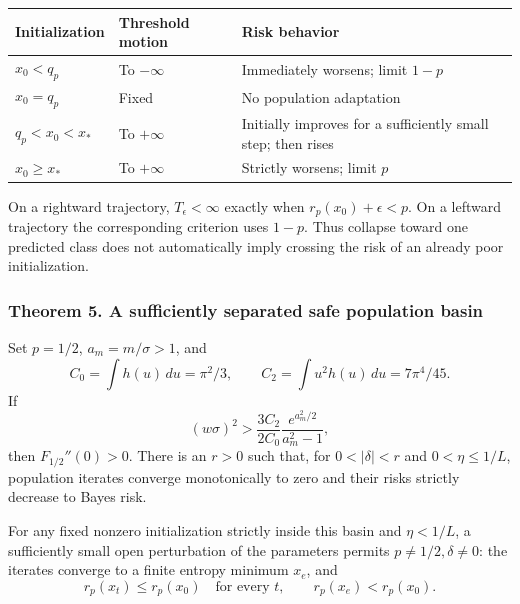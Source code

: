 {\def\LTcaptype{table} %
\begin{longtable}[]{@{}
  >{\raggedright\arraybackslash}p{}
  >{\raggedright\arraybackslash}p{}
  >{\raggedright\arraybackslash}p{}@{}}
\toprule\noalign{}
\begin{minipage}[b]{\linewidth}\raggedright
Initialization
\end{minipage} & \begin{minipage}[b]{\linewidth}\raggedright
Threshold motion
\end{minipage} & \begin{minipage}[b]{\linewidth}\raggedright
Risk behavior
\end{minipage} \\
\midrule\noalign{}
\endhead
\bottomrule\noalign{}
\endlastfoot
\(x_0<q_p\) & To \(-\infty\) & Immediately worsens; limit \(1-p\) \\
\(x_0=q_p\) & Fixed & No population adaptation \\
\(q_p<x_0<x_*\) & To \(+\infty\) & Initially improves for a sufficiently
small step; then rises \\
\(x_0\ge x_*\) & To \(+\infty\) & Strictly worsens; limit \(p\) \\
\end{longtable}
}

On a rightward trajectory, \(T_\epsilon<\infty\) exactly when
\(r_p(x_0)+\epsilon<p\). On a leftward trajectory the corresponding
criterion uses \(1-p\). Thus collapse toward one predicted class does
not automatically imply crossing the risk of an already poor
initialization.

\subsubsection{Theorem 5. A sufficiently separated safe population
basin}\label{draft-theorem-5.-a-sufficiently-separated-safe-population-basin}

Set \(p=1/2\), \(a_m=m/\sigma>1\), and \[
C_0=\int h(u)\,du=\pi^2/3,\qquad
C_2=\int u^2h(u)\,du=7\pi^4/45.
\] If \[
(w\sigma)^2>
\frac{3C_2}{2C_0}\frac{e^{a_m^2/2}}{a_m^2-1},
\] then \(F_{1/2}''(0)>0\). There is an \(r>0\) such that, for
\(0<|\delta|<r\) and \(0<\eta\le1/L\), population iterates converge
monotonically to zero and their risks strictly decrease to Bayes risk.

For any fixed nonzero initialization strictly inside this basin and
\(\eta<1/L\), a sufficiently small open perturbation of the parameters
permits \(p\ne1/2,\delta\ne0\): the iterates converge to a finite
entropy minimum \(x_e\), and \[
r_p(x_t)\le r_p(x_0)\quad\text{for every }t,\qquad
r_p(x_e)<r_p(x_0).
\]

